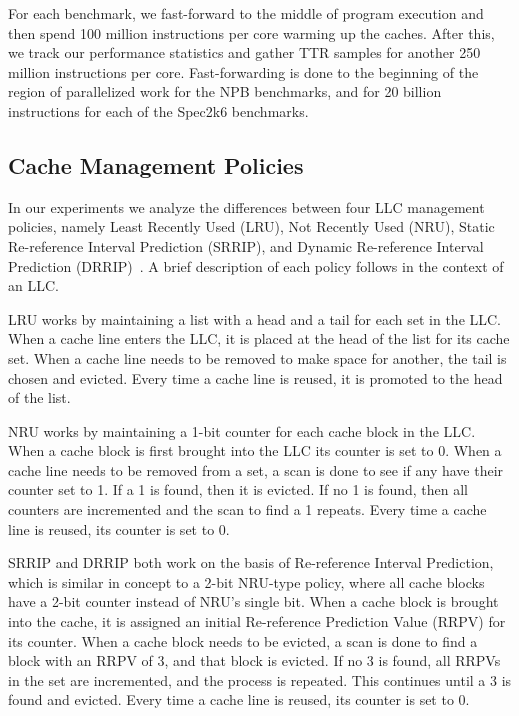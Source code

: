 For each benchmark, we fast-forward to the middle of program execution
and then spend 100 million instructions per core warming up the
caches.  After this, we track our performance statistics and gather
TTR samples for another 250 million instructions per core.
Fast-forwarding is done to the beginning of the region of parallelized
work for the NPB benchmarks, and for 20 billion instructions
for each of the Spec2k6 benchmarks.

\subsection{Cache Management Policies}
\label{sec:policies}

In our experiments we analyze the differences between four LLC
management policies, namely Least Recently Used (LRU), Not Recently Used
(NRU), Static Re-reference Interval Prediction (SRRIP), and Dynamic
Re-reference Interval Prediction (DRRIP)~\cite{jaleeltheobald10}.  A brief
description of each policy follows in the context of an LLC.

LRU works by maintaining a list with a head and a tail for each set in
the LLC.  When a cache
line enters the LLC, it is placed at the head of the list for its
cache set.  When a cache line needs to be removed to make space for
another, the tail is chosen and evicted.  Every time a cache line is
reused, it is promoted to the head of the list.

NRU works by maintaining a 1-bit counter for each cache block in the
LLC.  When a cache block is first brought into the LLC its counter is
set to 0.  When a cache line needs to be removed from a set, a scan is
done to see if any have their counter set to 1.  If a 1 is found, then
it is evicted.  If no 1 is found, then all counters are incremented and
the scan to find a 1 repeats.  Every time a cache line is reused, its
counter is set to 0.

SRRIP and DRRIP both work on the basis of Re-reference Interval
Prediction, which is similar in concept to a 2-bit NRU-type policy,
where all cache blocks have a 2-bit counter instead of NRU's single
bit.  When a cache block is brought into the cache, it is assigned an
initial Re-reference Prediction Value (RRPV) for its counter.  When a cache block
needs to be evicted, a scan is done to find a block with an RRPV of 3,
and that block is evicted.  If no 3 is found, all RRPVs in the set are
incremented, and the process is repeated.  This continues until a 3 is
found and evicted.  Every time a cache line is reused, its counter is
set to 0.


